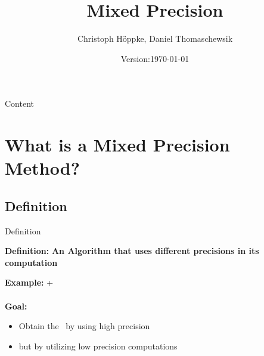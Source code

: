 \documentclass[10pt]{beamer}
\title{Mixed Precision}
\author{Christoph Höppke, Daniel Thomaschewsik}
\institute[TU Dortmund]{TU Dortmund}
\date{Version:\today}
\begin{document}
\begin{frame}[c]
  \titlepage
\end{frame}

\logo{}

\begin{frame}{Content}
\tableofcontents

\end{frame}
\section{What is a Mixed Precision Method?}
\subsection{Definition}
\begin{frame}{Definition}

\begin{block}{\textbf{Definition:}}
\textbf{An Algorithm that 
uses different precisions in its computation}
\end{block}

\textbf{Example:} \color{red}{double(a)} \color{black}+ \color{blue}{float(b)}\color{black}
~\\~\\
\textbf{Goal: } 
\begin{itemize}
\item[] Obtain the \color{red}{same accuracy}\color{black}~by using 
high precision
\item[] but \color{blue}{better performance} \color{black}
by utilizing low precision computations
\end{itemize}
\end{frame}
\end{document}
